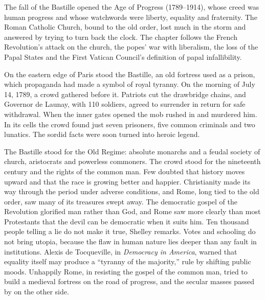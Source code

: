 
\begin{inbrief}
The fall of the Bastille opened the Age of Progress (1789--1914), whose creed was human progress and
whose watchwords were liberty, equality and fraternity. The Roman Catholic Church, bound to the old
order, lost much in the storm and answered by trying to turn back the clock. The chapter follows the
French Revolution's attack on the church, the popes' war with liberalism, the loss of the Papal
States and the First Vatican Council's definition of papal infallibility.
\end{inbrief}

On the eastern edge of Paris stood the Bastille, an old fortress used as a prison, which propaganda
had made a symbol of royal tyranny. On the morning of July 14, 1789, a crowd gathered before it.
Patriots cut the drawbridge chains, and Governor de Launay, with 110 soldiers, agreed to surrender
in return for safe withdrawal. When the inner gates opened the mob rushed in and murdered him. In its cells the crowd found just seven prisoners, five common criminals and two lunatics. The sordid facts were
soon turned into heroic legend.

The Bastille stood for the Old Regime: absolute monarchs and a feudal society of church, aristocrats
and powerless commoners. The crowd stood for the nineteenth century and the rights of the common man.
Few doubted that history moves upward and that the race is growing better and happier. Christianity
made its way through the period under adverse conditions, and Rome, long tied to the old order, saw
many of its treasures swept away. The democratic gospel of the Revolution glorified man rather than
God, and Rome saw more clearly than most Protestants that the devil can be democratic when it suits
him. Ten thousand people telling a lie do not make it true, Shelley remarks. Votes and schooling do
not bring utopia, because the flaw in human nature lies deeper than any fault in institutions.
Alexis de Tocqueville, in \emph{Democracy in America}, warned that equality itself may produce a
``tyranny of the majority,'' rule by shifting public moods. Unhappily Rome, in resisting the gospel
of the common man, tried to build a medieval fortress on the road of progress, and the secular masses
passed by on the other side.

